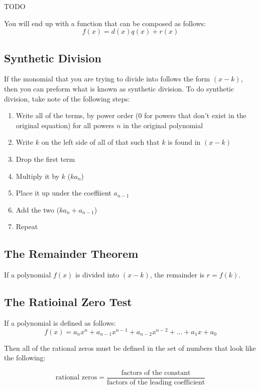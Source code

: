 TODO

You will end up with a function that can be composed as follows:
\begin{equation}
  f(x)=d(x)q(x)+r(x)
\end{equation}

\subsection{Synthetic Division}
If the monomial that you are trying to divide into follows the form $(x-k)$,
then you can preform what is known as synthetic division.  To do synthetic
division, take note of the following steps:

\begin{enumerate}
  \item Write all of the terms, by power order (0 for powers that don't exist in
  the original equation) for all powers $n$ in the original polynomial
  \item Write $k$ on the left side of all of that such that $k$ is found in
  $(x-k)$
  \item Drop the first term
  \item Multiply it by $k$ ($ka_n$)
  \item Place it up under the coeffiient $a_{n-1}$
  \item Add the two ($ka_n+a_{n-1}$)
  \item Repeat
\end{enumerate}

\subsection{The Remainder Theorem}
If a polynomial $f(x)$ is divided into $(x-k)$, the remainder is $r=f(k)$.

\subsection{The Ratioinal Zero Test}
If a polynomial is defined as follows:
\begin{equation}
f(x)=a_nx^n+a_{n-1}x^{n-1}+a_{n-2}x^{n-2}+...+a_1x+a_0
\end{equation}

Then all of the rational zeros must be defined in the set of numbers that look
like the following:

\begin{equation}
  \text{rational zeros}=\frac{\text{factors of the constant}}{
    \text{factors of the leading coefficient}}
\end{equation}

